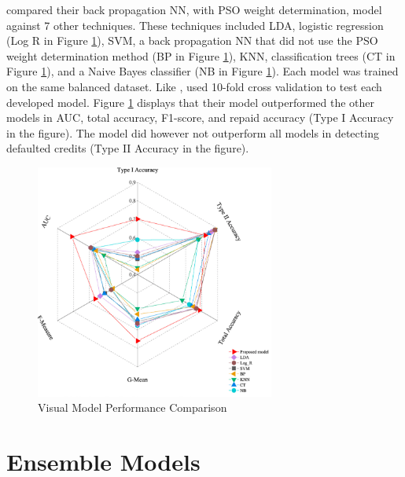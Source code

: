\vspace{10pt}

\textcite{NNShen} compared their back propagation NN, with PSO weight determination, model against 7 other techniques. These techniques included LDA, logistic regression (Log R in Figure \ref{fig:shen}), SVM, a back propagation NN that did not use the PSO weight determination method (BP in Figure \ref{fig:shen}), KNN, classification trees (CT in Figure \ref{fig:shen}), and a Naive Bayes classifier (NB in Figure \ref{fig:shen}). Each model was trained on the same balanced dataset. Like \textcite{NNWest}, \textcite{NNShen} used 10-fold cross validation to test each developed model. Figure \ref{fig:shen} displays that their model outperformed the other models in AUC, total accuracy, F1-score, and repaid accuracy (Type I Accuracy in the figure). The model did however not outperform all models in detecting defaulted credits (Type II Accuracy in the figure). 

\vspace{10pt}

\begin{figure}[!htb]
\centering
\includegraphics[width=0.7\textwidth]{images/shen.png}
\caption{\textcite{NNShen} Visual Model Performance Comparison}
\label{fig:shen}
\end{figure}

\vspace{10pt}


\section{Ensemble Models}

